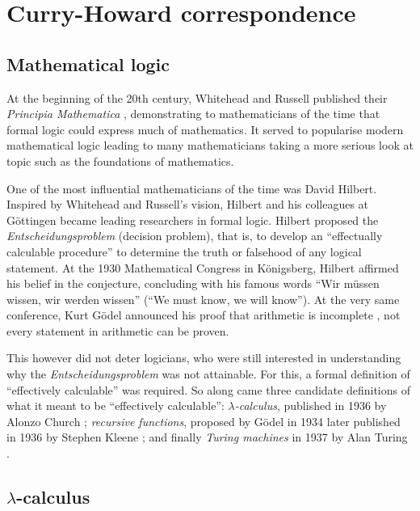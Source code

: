 \section{Curry-Howard correspondence}

\subsection{Mathematical logic}\label{logic_chapter}

At the beginning of the 20th century, Whitehead and Russell published their \emph{Principia Mathematica} \cite{GlossarWiki:Whitehead_Russell:1910}, demonstrating to mathematicians of the time that formal logic could express much of mathematics. It served to popularise modern mathematical logic leading to many mathematicians taking a more serious look at topic such as the foundations of mathematics.

One of the most influential mathematicians of the time was David Hilbert. Inspired by Whitehead and Russell's vision, Hilbert and his colleagues at G\"ottingen became leading researchers in formal logic. Hilbert proposed the \emph{Entscheidungsproblem} (decision problem), that is, to develop an ``effectually calculable procedure'' to determine the truth or falsehood of any logical statement. At the 1930 Mathematical Congress in K\"onigsberg, Hilbert affirmed his belief in the conjecture, concluding with his famous words ``Wir m\"ussen wissen, wir werden wissen'' (``We must know, we will know''). At the very same conference, Kurt G\"odel announced his proof that arithmetic is incomplete \cite{GlossarWiki:Goedel:1931}, not every statement in arithmetic can be proven.

This however did not deter logicians, who were still interested in understanding why the \emph{Entscheidungsproblem} was not attainable.
For this, a formal definition of ``effectively calculable'' was required.
So along came three candidate definitions of what it meant to be ``effectively calculable'': \emph{$\lambda$-calculus}, published in 1936 by Alonzo Church \cite{church-unsolvableproblemof-1936}; \emph{recursive functions}, proposed by G\"odel in 1934 later published in 1936 by Stephen Kleene \cite{kleene1936}; and finally \emph{Turing machines} in 1937 by Alan Turing \cite{turing1936a}.

\subsection{\texorpdfstring{$\lambda$}{}-calculus}

